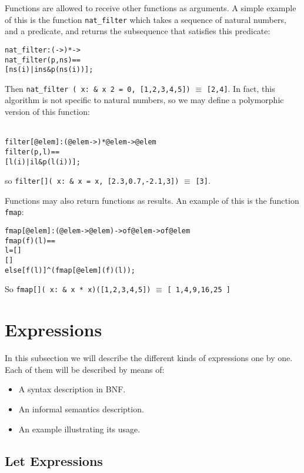 \documentclass[\pformat,12pt]{article}
\begin{document}
Functions are allowed to receive other functions as arguments. A
simple example of this is the function \texttt{nat\_filter} which
takes a sequence of natural numbers, and a predicate, and returns the
subsequence that satisfies this predicate:
\begin{alltt}
  nat_filter : ( -> ) *  -> 
  nat_filter (p,ns) ==
    [ns(i) | i  ns & p(ns(i))];
\end{alltt}
Then 
  \texttt{nat\_filter ( x: \& x  2 = 0, [1,2,3,4,5])} $\equiv$ \texttt{[2,4]}.
In fact, this algorithm is not specific to natural numbers, so we may
define a polymorphic version of this function:
\begin{alltt}\label{filterdef}
  filter[@elem]: (@elem -> ) *  @elem ->  @elem
  filter (p,l) ==
    [l(i) | i  l & p(l(i))];
\end{alltt}
so \texttt{filter[]( x: \&
   x = x, [2.3,0.7,-2.1,3])} $\equiv$  \texttt{[3]}.


Functions may also return functions as results. An example of this is
the function \texttt{fmap}:
\begin{alltt}
  fmap[@elem]: (@elem -> @elem) ->  of @elem ->  of @elem
  fmap (f)(l) ==
     l = []
     []
    else [f( l)]\verb+^+(fmap[@elem] (f)( l));
\end{alltt}
So \texttt{fmap[]( x: \& x * x)([1,2,3,4,5])} $\equiv$ 
\texttt{[ 1,4,9,16,25 ]}

\section{Expressions}

In this subsection we will describe the different kinds of expressions
one by one. Each of them will be described by means of:
\begin{itemize}
\item A syntax description in BNF.
\item An informal semantics description.
\item An example illustrating its usage.
\end{itemize}

\subsection{Let Expressions}\label{let-exp}
\end{document}
